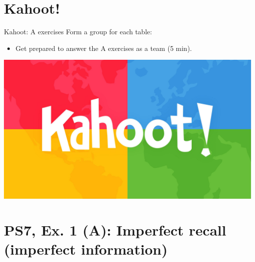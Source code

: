 \section{Kahoot!}

\begin{frame}{Kahoot: A exercises}
  Form a group for each table:
  \begin{itemize}
    \item Get prepared to answer the A exercises as a team (5 min).
  \end{itemize}
  \includegraphics[width=\textwidth]{figures/kahoot}
\end{frame}


\section{PS7, Ex. 1 (A): Imperfect recall (imperfect information)}

